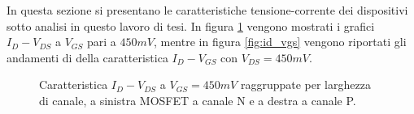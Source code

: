In questa sezione si presentano le caratteristiche tensione-corrente dei dispositivi sotto analisi in questo lavoro di tesi.
In figura \ref{fig:id_vds} vengono mostrati i grafici $I_{D} - V_{DS}$ a $V_{GS}$ pari a $450mV$, mentre in figura \ref{fig:id_vgs} vengono riportati gli andamenti di della caratteristica $I_D - V_{GS}$ con $V_{DS} = 450mV$.


\begin{figure}[ht]
    \centering
  
    \caption[Caratteristica $I_D - V_{DS}$ NMOS e PMOS]{Caratteristica $I_D - V_{DS}$ a $V_{GS} = 450mV$ raggruppate per larghezza di canale, a sinistra MOSFET a canale N e a destra a canale P.}
    \label{fig:id_vds}
  \end{figure}



